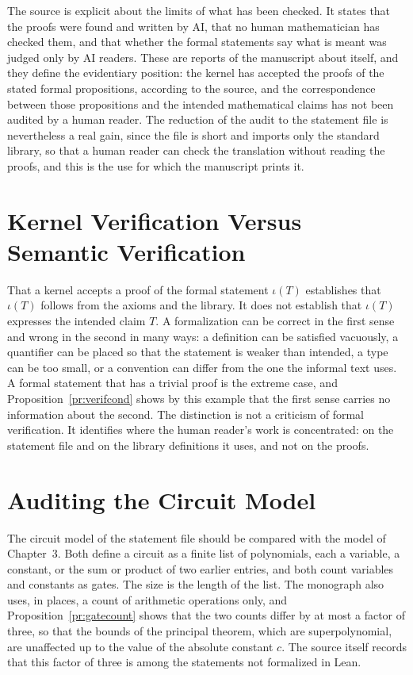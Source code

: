 \documentclass[11pt,letterpaper]{report}
\theoremstyle{plain}
\theoremstyle{definition}
\theoremstyle{remark}
\begin{document}
The source is explicit about the limits of what has been checked. It states that the proofs were found and written by AI, that no human mathematician has checked them, and that whether the formal statements say what is meant was judged only by AI readers. These are reports of the manuscript about itself, and they define the evidentiary position: the kernel has accepted the proofs of the stated formal propositions, according to the source, and the correspondence between those propositions and the intended mathematical claims has not been audited by a human reader. The reduction of the audit to the statement file is nevertheless a real gain, since the file is short and imports only the standard library, so that a human reader can check the translation without reading the proofs, and this is the use for which the manuscript prints it.

\section{Kernel Verification Versus Semantic Verification}

That a kernel accepts a proof of the formal statement $\iota(T)$ establishes that $\iota(T)$ follows from the axioms and the library. It does not establish that $\iota(T)$ expresses the intended claim $T$. A formalization can be correct in the first sense and wrong in the second in many ways: a definition can be satisfied vacuously, a quantifier can be placed so that the statement is weaker than intended, a type can be too small, or a convention can differ from the one the informal text uses. A formal statement that has a trivial proof is the extreme case, and Proposition~\ref{pr:verifcond} shows by this example that the first sense carries no information about the second. The distinction is not a criticism of formal verification. It identifies where the human reader's work is concentrated: on the statement file and on the library definitions it uses, and not on the proofs.

\section{Auditing the Circuit Model}

The circuit model of the statement file should be compared with the model of Chapter~3. Both define a circuit as a finite list of polynomials, each a variable, a constant, or the sum or product of two earlier entries, and both count variables and constants as gates. The size is the length of the list. The monograph also uses, in places, a count of arithmetic operations only, and Proposition~\ref{pr:gatecount} shows that the two counts differ by at most a factor of three, so that the bounds of the principal theorem, which are superpolynomial, are unaffected up to the value of the absolute constant $c$. The source itself records that this factor of three is among the statements not formalized in Lean.
\end{document}
